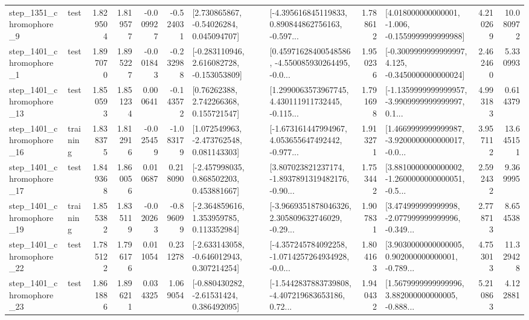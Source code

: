 \begin{tabular}{llrrrrllrlrr}
  step\_1351\_chromophore\_9 &      test &      1.829504 &    1.819577 &     -0.009927 & -0.524031 &     [2.730865867, -0.54026284, 0.045094707] &  [-4.395616845119833, 0.890844862756163, -0.597... &       1.788612 &   [4.018000000000001, -1.006, -0.1559999999999988] &            4.210269 &         10.080972 \\
  step\_1401\_chromophore\_1 &      test &      1.897070 &    1.895227 &     -0.001843 & -0.232988 &   [-0.283110946, 2.616082728, -0.153053809] &  [0.45971628400548586, -4.550085930264495, -0.0... &       1.950236 &  [-0.3009999999999997, 4.125, -0.3450000000000024] &            2.462460 &          5.330993 \\
 step\_1401\_chromophore\_13 &      test &      1.850593 &    1.851234 &      0.000641 & -0.143572 &      [0.76262388, 2.742266368, 0.155721547] &  [1.2990063573967745, 4.430111911732445, -0.115... &       1.791698 &  [-1.1359999999999957, -3.9909999999999997, 0.1... &            4.993183 &          0.614379 \\
 step\_1401\_chromophore\_16 &  training &      1.838375 &    1.812916 &     -0.025459 & -1.083179 &    [1.072549963, -2.473762548, 0.081143303] &  [-1.673161447994967, 4.053655647492442, -0.977... &       1.913271 &  [1.4669999999999987, -3.9200000000000017, -0.0... &            3.957112 &         13.645151 \\
 step\_1401\_chromophore\_17 &      test &      1.849368 &    1.860056 &      0.010687 &  0.218090 &    [-2.457998035, 0.868502203, 0.453881667] &  [3.807023821237174, -1.8937891319482176, -0.90... &       1.753442 &  [3.8810000000000002, -1.2600000000000051, -0.5... &            2.592432 &          9.369995 \\
 step\_1401\_chromophore\_19 &  training &      1.855382 &    1.835119 &     -0.020263 & -0.896099 &    [-2.364859616, 1.353959785, 0.113352984] &  [-3.9669351878046326, 2.305809632746029, -0.29... &       1.907831 &  [3.474999999999998, -2.077999999999996, -0.349... &            2.778713 &          8.654538 \\
 step\_1401\_chromophore\_22 &      test &      1.785122 &    1.796176 &      0.011054 &  0.231278 &   [-2.633143058, -0.646012943, 0.307214254] &  [-4.357245784092258, -1.0714257264934928, -0.0... &       1.804163 &  [3.9030000000000005, 0.902000000000001, -0.789... &            4.753013 &         11.329428 \\
 step\_1401\_chromophore\_23 &      test &      1.861886 &    1.896211 &      0.034325 &  1.069054 &    [-0.880430282, -2.61531424, 0.386492095] &  [-1.5442837883739808, -4.407219683653186, 0.72... &       1.940432 &  [1.5679999999999996, 3.882000000000005, -0.888... &            5.210863 &          4.122881 \\

\end{tabular}
